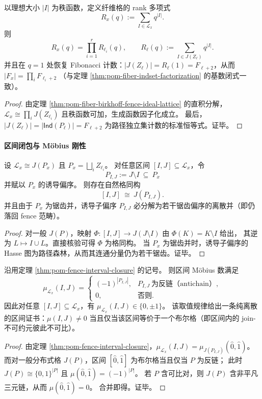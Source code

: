 \begin{corollary}\label{cor:pom-fiber-fence-rank-poly-factorization}
以理想大小 \(|I|\) 为秩函数，定义纤维格的 rank 多项式
\[
R_x(q):=\sum_{I\in \mathcal L_x} q^{|I|}.
\]
则
\[
R_x(q)=\prod_{i=1}^r R_{\ell_i}(q),
\qquad
R_\ell(q):=\sum_{I\in J(Z_\ell)} q^{|I|}.
\]
并且在 \(q=1\) 处恢复 Fibonacci 计数：\(|J(Z_\ell)|=R_\ell(1)=F_{\ell+2}\)，从而
\(
|F_x|=\prod_i F_{\ell_i+2}
\)
（与定理 \ref{thm:pom-fiber-indset-factorization} 的基数闭式一致）。
\end{corollary}
\begin{proof}
由定理 \ref{thm:pom-fiber-birkhoff-fence-ideal-lattice} 的直积分解，
\(\mathcal L_x\cong\prod_i J(Z_{\ell_i})\) 且秩函数可加，生成函数因子化成立。
最后，\(|J(Z_\ell)|=|\mathsf{Ind}(P_\ell)|=F_{\ell+2}\) 为路径独立集计数的标准恒等式。证毕。
\end{proof}

\paragraph{区间闭包与 Möbius 刚性}
\begin{theorem}\label{thm:pom-fence-interval-closure}
设 \(\mathcal L_x\cong J(P_x)\) 且 \(P_x=\bigsqcup_i Z_{\ell_i}\)。
对任意区间 \([I,J]\subseteq \mathcal L_x\)，令
\[
P_{I,J}:=J\setminus I\ \subseteq\ P_x
\]
并赋以 \(P_x\) 的诱导偏序。
则存在自然格同构
\[
[I,J]\ \cong\ J(P_{I,J}).
\]
并且由于 \(P_x\) 为锯齿并，诱导子偏序 \(P_{I,J}\) 必分解为若干锯齿偏序的离散并（即仍落回 fence 范畴）。
\end{theorem}
\begin{proof}
对一般 \(J(P)\)，映射 \(\Phi:[I,J]\to J(J\setminus I)\) 由 \(\Phi(K)=K\setminus I\) 给出，
其逆为 \(L\mapsto I\cup L\)。直接核验可得 \(\Phi\) 为格同构。
当 \(P_x\) 为锯齿并时，诱导子偏序的 Hasse 图为路径森林，从而其连通分量仍为若干锯齿。证毕。
\end{proof}

\begin{theorem}\label{thm:pom-fence-mobius-rigidity}
沿用定理 \ref{thm:pom-fence-interval-closure} 的记号。
则区间 Möbius 数满足
\[
\mu_{\mathcal L_x}(I,J)=
\begin{cases}
(-1)^{|P_{I,J}|},& P_{I,J}\ \text{为反链（antichain）},\\
0,& \text{否则}.
\end{cases}
\]
因此对任意 \([I,J]\subseteq\mathcal L_x\)，有 \(\mu_{\mathcal L_x}(I,J)\in\{0,\pm 1\}\)。
该取值规律给出一条纯离散的区间证书：\(\mu(I,J)\neq 0\) 当且仅当该区间等价于一个布尔格（即区间内的 join-不可约元彼此不可比）。
\end{theorem}
\begin{proof}
由定理 \ref{thm:pom-fence-interval-closure}，\(\mu_{\mathcal L_x}(I,J)=\mu_{J(P_{I,J})}(\hat0,\hat1)\)。
而对一般分布式格 \(J(P)\)，区间 \([\hat0,\hat1]\) 为布尔格当且仅当 \(P\) 为反链；
此时 \(J(P)\cong \{0,1\}^{|P|}\) 且 \(\mu(\hat0,\hat1)=(-1)^{|P|}\)。
若 \(P\) 含可比对，则 \(J(P)\) 含非平凡三元链，从而 \(\mu(\hat0,\hat1)=0\)。
合并即得。证毕。
\end{proof}

